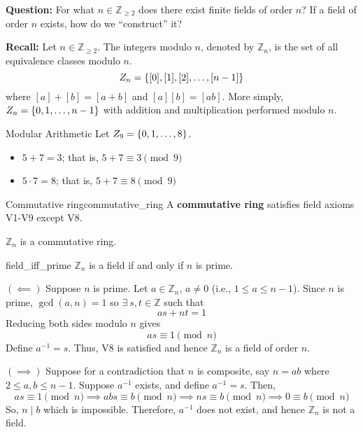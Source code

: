 \textbf{Question:} For what $ n\in\mathbb{Z}_{\geqslant 2} $ does there exist
finite fields of order $ n $? If a field of order $ n $ exists, how do
we ``construct'' it?

\textbf{Recall:} Let $ n\in\mathbb{Z}_{\geqslant 2} $.
The integers modulo $ n $, denoted by
$ \mathbb{Z}_n $, is the set of all equivalence classes modulo $ n $.
\[ \relax{Z}_n=\{[0],[1],[2],\ldots ,[n-1]\} \]
where $ [a]+[b]=[a+b] $ and $ [a][b]=[ab] $.
More simply, $ \relax{Z}_{n}=\{0,1,\ldots ,n-1\} $
with addition and multiplication performed modulo $ n $.

\begin{Example}{Modular Arithmetic}{}
    Let $ \relax{Z}_9=\{0,1,\ldots ,8\} $.
    \begin{itemize}
        \item $ 5+7=3 $; that is, $ 5+7\equiv 3 \pmod{9} $
        \item $ 5\cdot 7=8 $; that is, $ 5+7\equiv 8 \pmod{9} $
    \end{itemize}
\end{Example}

\begin{Definition}{Commutative ring}{commutative_ring}
    A \textbf{commutative ring} satisfies field axioms V1-V9 except
    V8.
\end{Definition}

\begin{Theorem}{}{}
    $ \mathbb{Z}_n $ is a commutative ring.
\end{Theorem}

\begin{Theorem}{}{field_iff_prime}
    $ \mathbb{Z}_n $ is a field if and only if $ n $ is prime.
\end{Theorem}

\begin{Proof}{}{}
    $ (\impliedby) $ Suppose $ n $ is prime. Let $ a\in\mathbb{Z}_n $, $ a\neq 0 $
    (i.e., $ 1\leqslant a\leqslant n-1 $). Since $ n $ is prime, $ \gcd(a,n)=1 $
    so $ \exists\ s,t\in\mathbb{Z} $ such that
    \[ as+nt=1 \]
    Reducing both sides modulo $ n $ gives
    \[ as\equiv 1 \pmod{n} \]
    Define $ a^{-1}=s $. Thus, V8 is satisfied and hence $ \mathbb{Z}_n $
    is a field of order $ n $.

    $ (\implies) $ Suppose for a contradiction that $ n $ is composite, say $ n=ab $
    where $ 2\leqslant a,b\leqslant n-1 $. Suppose $ a^{-1} $ exists, and define
    $ a^{-1}=s $. Then,
    \[ as\equiv 1 \pmod{n}\implies abs\equiv b\pmod{n}\implies ns\equiv b \pmod{n}
        \implies 0\equiv b\pmod{n} \]
    So, $ n\mid b $ which is impossible. Therefore, $ a^{-1} $ does not exist, and hence
    $ \mathbb{Z}_n $ is not a field.
\end{Proof}

